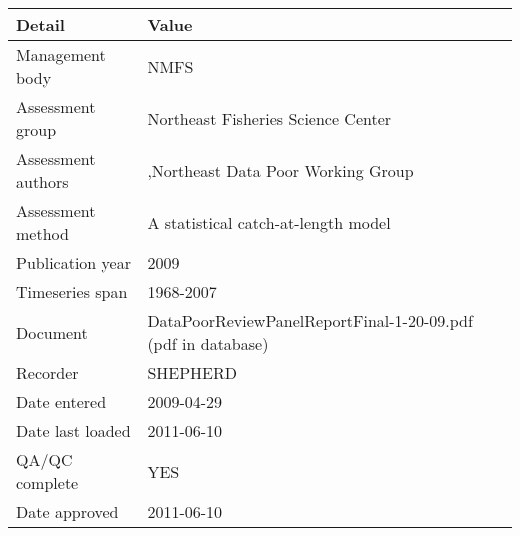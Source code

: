 \begin{table}[htb]
\centering
\begin{tabular}{lp{7cm}}
\toprule
Detail & Value \\
\midrule
Management body    & NMFS                                                         \\
Assessment group   & Northeast Fisheries Science Center                           \\
Assessment authors & ,{Northeast Data Poor Working Group}                         \\
Assessment method  & A statistical catch-at-length model                          \\
Publication year   & 2009                                                         \\
Timeseries span    & 1968-2007                                                    \\
Document           & DataPoorReviewPanelReportFinal-1-20-09.pdf (pdf in database) \\
Recorder           & SHEPHERD                                                     \\
Date entered       & 2009-04-29                                                   \\
Date last loaded   & 2011-06-10                                                   \\
QA/QC complete     & YES                                                          \\
Date approved      & 2011-06-10                                                   \\
\bottomrule
\end{tabular}
\label{tab:assessdet}
\end{table}
